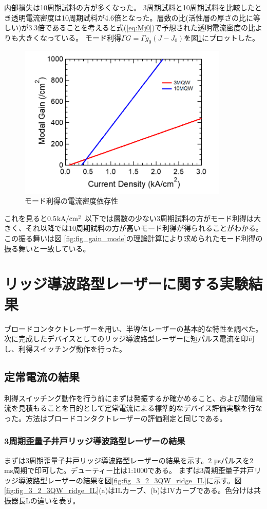 {内部損失は10周期試料の方が多くなった。
3周期試料と10周期試料を比較したとき透明電流密度は10周期試料が4.6倍となった。層数の比(活性層の厚さの比に等しい)が3.3倍であることを考えると式(\ref{eq:Mj0})で予想された透明電流密度の比よりも大きくなっている。
モード利得$\Gamma G=\Gamma g_{0}(J-J_{0})$を図\ref{fig:fig_3_1_broadcontact_modal_gain}にプロットした。

\begin{figure}[t]
	\centering
	\includegraphics[width=10cm]{figure/fig_3_1_broadcontact_modal_gain.png}
	\caption{モード利得の電流密度依存性}
	\label{fig:fig_3_1_broadcontact_modal_gain}
\end{figure}
これを見ると0.5$ \rm{kA/cm^2}$ 以下では層数の少ない3周期試料の方がモード利得は大きく、それ以降では10周期試料の方が高いモード利得が得られることがわかる。この振る舞いは図	\ref{fig:fig_gain_mode}の理論計算により求められたモード利得の振る舞いと一致している。
\clearpage
\section{リッジ導波路型レーザーに関する実験結果}%
ブロードコンタクトレーザーを用い、半導体レーザーの基本的な特性を調べた。次に完成したデバイスとしてのリッジ導波路型レーザーに短パルス電流を印可し、利得スイッチング動作を行った。
\subsection{定常電流の結果}

利得スイッチング動作を行う前にまずは発振するか確かめること、および閾値電流を見積もることを目的として定常電流による標準的なデバイス評価実験を行なった。方法はブロードコンタクトレーザーの評価測定と同じである。
\subsubsection{3周期歪量子井戸リッジ導波路型レーザーの結果}
まずは3周期歪量子井戸リッジ導波路型レーザーの結果を示す。2 \si{\micro s}パルスを2 ms周期で印可した。デューティー比は1:1000である。
まずは3周期歪量子井戸リッジ導波路型レーザーの結果を図\ref{fig:fig_3_2_3QW_ridge_IL}に示す。図\ref{fig:fig_3_2_3QW_ridge_IL}(a)はILカーブ、(b)はIVカーブである。色分けは共振器長Lの違いを表す。

}
